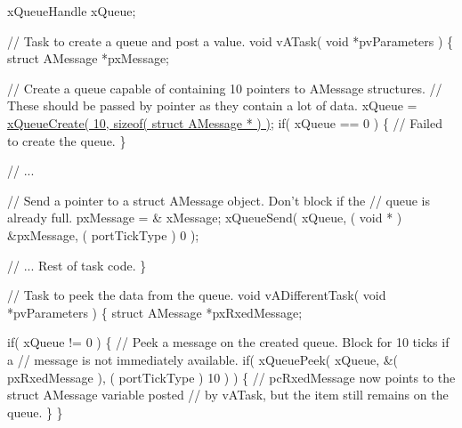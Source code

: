 \begin{DoxyPre}xQueueHandle xQueue;\end{DoxyPre}



\begin{DoxyPre}// Task to create a queue and post a value.
void vATask( void *pvParameters )
\{
struct AMessage *pxMessage;\end{DoxyPre}



\begin{DoxyPre}   // Create a queue capable of containing 10 pointers to AMessage structures.
   // These should be passed by pointer as they contain a lot of data.
   xQueue = \hyperlink{queue_8h_aeb858b824bd74a934ea7ebb81af2a6bb}{xQueueCreate( 10, sizeof( struct AMessage * ) )};
   if( xQueue == 0 )
   \{
    // Failed to create the queue.
   \}\end{DoxyPre}



\begin{DoxyPre}   // ...\end{DoxyPre}



\begin{DoxyPre}   // Send a pointer to a struct AMessage object.  Don't block if the
   // queue is already full.
   pxMessage = \& xMessage;
   xQueueSend( xQueue, ( void * ) \&pxMessage, ( portTickType ) 0 );\end{DoxyPre}



\begin{DoxyPre}   // ... Rest of task code.
\}\end{DoxyPre}



\begin{DoxyPre}// Task to peek the data from the queue.
void vADifferentTask( void *pvParameters )
\{
struct AMessage *pxRxedMessage;\end{DoxyPre}



\begin{DoxyPre}   if( xQueue != 0 )
   \{
    // Peek a message on the created queue.  Block for 10 ticks if a
    // message is not immediately available.
    if( xQueuePeek( xQueue, \&( pxRxedMessage ), ( portTickType ) 10 ) )
    \{
        // pcRxedMessage now points to the struct AMessage variable posted
        // by vATask, but the item still remains on the queue.
    \}
   \}\end{DoxyPre}



